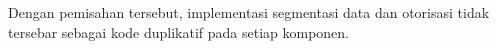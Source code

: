 Dengan pemisahan tersebut, implementasi segmentasi data dan otorisasi tidak tersebar sebagai kode duplikatif pada setiap komponen.

